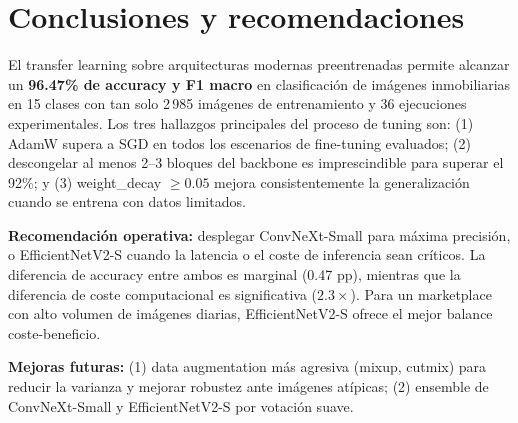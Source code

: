 \section{Conclusiones y recomendaciones}

El transfer learning sobre arquitecturas modernas preentrenadas permite alcanzar un \textbf{96.47\% de accuracy y F1 macro} en clasificación de imágenes inmobiliarias en 15 clases con tan solo 2\,985 imágenes de entrenamiento y 36 ejecuciones experimentales. Los tres hallazgos principales del proceso de tuning son: (1) AdamW supera a SGD en todos los escenarios de fine-tuning evaluados; (2) descongelar al menos 2--3 bloques del backbone es imprescindible para superar el 92\%; y (3) weight\_decay $\geq 0.05$ mejora consistentemente la generalización cuando se entrena con datos limitados.

\textbf{Recomendación operativa:} desplegar ConvNeXt-Small para máxima precisión, o EfficientNetV2-S cuando la latencia o el coste de inferencia sean críticos. La diferencia de accuracy entre ambos es marginal (0.47 pp), mientras que la diferencia de coste computacional es significativa ($2.3\times$). Para un marketplace con alto volumen de imágenes diarias, EfficientNetV2-S ofrece el mejor balance coste-beneficio.

\textbf{Mejoras futuras:} (1) data augmentation más agresiva (mixup, cutmix) para reducir la varianza y mejorar robustez ante imágenes atípicas; (2) ensemble de ConvNeXt-Small y EfficientNetV2-S por votación suave.